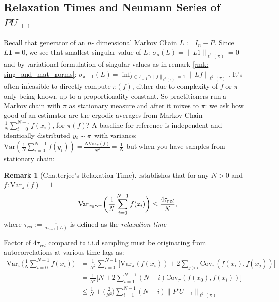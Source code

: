 \documentclass[preprint]{imsart}
\theoremstyle{plain}
\theoremstyle{definition}
\newtheorem{remark}{Remark}
\begin{document}
\subsection{Relaxation Times and Neumann Series of $PU_{\perp 1}$}
\label{sec:dev_avg_relaxation_time}
Recall that generator of an $n$- dimensional Markov Chain $L:=I_{n}-P$. Since $L\mathbf{1}=0$, we see that smallest singular value of $L$: $\sigma_{n}(L)=\|L1\|_{\ell^{2}(\pi)}=0$ and by variational formulation of singular values as in remark \ref{rmk: sing_and_mat_norms}: $\sigma_{n-1}(L)=\inf_{f \in V_{\perp 1}\cap\|f\|_{\ell^{2}(\pi)}=1}\|Lf\|_{\ell^{2}(\pi)}$. It's often infeasible to directly compute $\pi(f)$, either due to complexity of $f$ or $\pi$ only being known up to a proportionality constant. So practitioners run a Markov chain with $\pi$ as stationary measure and after it mixes to $\pi$: we ask how good of an estimator are the ergodic averages from Markov Chain $\frac{1}{N}\sum_{i=0}^{N-1}f(x_{i})$, for $\pi(f)$? A baseline for reference is independent and identically distributed $y_{i} \thicksim \pi$ with variance:
$\mathrm{Var}(\tfrac{1}{N}\sum_{i=0}^{N-1}f(y_{i}))=\tfrac{N \mathrm{Var}_{\pi}(f)}{N^{2}}=\tfrac{1}{N}$ but when you have samples from stationary chain:
\begin{remark}[Chatterjee's Relaxation Time]
\label{thm: var_erg_avgs}
\cite[Theorem 1.2]{chatterjee2023spectral} establishes that for any $N > 0$ and $f:\mathrm{Var}_{\pi}(f)=1$
\begin{align}
    \label{eq:relax_chatterjee}
    \mathrm{Var}_{x_{0}\thicksim \pi}\bigg(\frac{1}{N}\sum_{i=0}^{N-1}f(x_{i})\bigg) \leq  \frac{4\tau_{rel}}{N},
\end{align}
where $\tau_{rel}:=\frac{1}{\sigma_{n-1}(L)}$ is defined as the \emph{relaxation time}. 
\end{remark}
Factor of $4 \tau_{rel}$ compared to i.i.d sampling must be originating from autocorrelations at various time lags as:
\begin{align}
    \mathrm{Var}_{\pi}\Big(\tfrac{1}{N}\sum_{i=0}^{N-1}f(x_{i})\Big)& \nonumber =\tfrac{1}{N^{2}}\sum_{i=0}^{N-1}\Big[\mathrm{Var}_{\pi}(f(x_{i}))+2\sum_{j>i}\mathrm{Cov}_{\pi}(f(x_{i}),f(x_{j}))\Big] \\ & \label{eq:stationarity}= \tfrac{1}{N^{2}}\Big[N+2\sum_{i=1}^{N-1}(N-i)\mathrm{Cov}_{\pi}(f(x_{0}),f(x_{i}))\Big] \\ & \label{eq:corr_decay} \leq \tfrac{1}{N}+\Big(\tfrac{2}{N^{2}}\Big)\sum_{i=1}^{N-1}(N-i)\|P^{i}U_{\perp 1}\|_{\ell^{2}(\pi)} 
\end{align}
\end{document}
